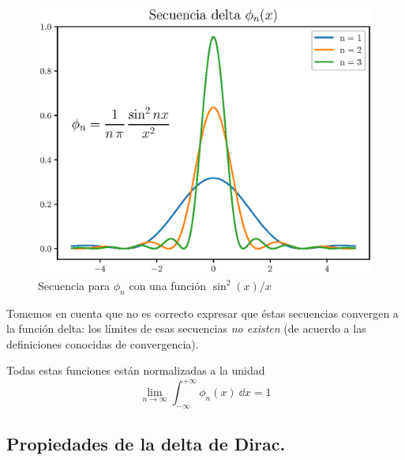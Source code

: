 \documentclass[12pt]{beamer}
\begin{document}
\begin{figure}[H]
    \centering
    \includegraphics[scale=0.8]{Imagenes/secuencia_delta_03.eps}
    \caption{Secuencia para $\phi_{n}$ con una función $\sin^{2}(x)/x$}
    \label{fig:plot_secuencia_03}
\end{figure}



Tomemos en cuenta que no es correcto expresar que éstas secuencias convergen a la función delta: los límites de esas secuencias \emph{no existen} (de acuerdo a las definiciones conocidas de convergencia).

Todas estas funciones están normalizadas a la unidad
\begin{equation}
\lim_{n \to \infty} \int_{- \infty}^{+ \infty} \phi_{n}(x) \: \dd{x} = 1
\label{eq:ecuacion_delta_05}
\end{equation}

\subsection{Propiedades de la delta de Dirac.}
\end{document}
